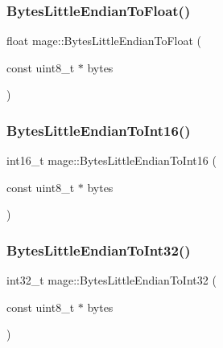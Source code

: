 \hypertarget{namespacemage_ae8c9922f140fd0f66a8dc71edca6ae0e}{}\label{namespacemage_ae8c9922f140fd0f66a8dc71edca6ae0e} 
\subsubsection{\texorpdfstring{Bytes\+Little\+Endian\+To\+Float()}{BytesLittleEndianToFloat()}}
{\footnotesize\ttfamily float mage\+::\+Bytes\+Little\+Endian\+To\+Float (\begin{DoxyParamCaption}\item[{const uint8\+\_\+t $\ast$}]{bytes }\end{DoxyParamCaption})}

\hypertarget{namespacemage_ac391c9723ff006ce3e3f824108dbcc61}{}\label{namespacemage_ac391c9723ff006ce3e3f824108dbcc61} 
\subsubsection{\texorpdfstring{Bytes\+Little\+Endian\+To\+Int16()}{BytesLittleEndianToInt16()}}
{\footnotesize\ttfamily int16\+\_\+t mage\+::\+Bytes\+Little\+Endian\+To\+Int16 (\begin{DoxyParamCaption}\item[{const uint8\+\_\+t $\ast$}]{bytes }\end{DoxyParamCaption})}

\hypertarget{namespacemage_ad3cd4209c8a542d2196091a4753a58b3}{}\label{namespacemage_ad3cd4209c8a542d2196091a4753a58b3} 
\subsubsection{\texorpdfstring{Bytes\+Little\+Endian\+To\+Int32()}{BytesLittleEndianToInt32()}}
{\footnotesize\ttfamily int32\+\_\+t mage\+::\+Bytes\+Little\+Endian\+To\+Int32 (\begin{DoxyParamCaption}\item[{const uint8\+\_\+t $\ast$}]{bytes }\end{DoxyParamCaption})}

